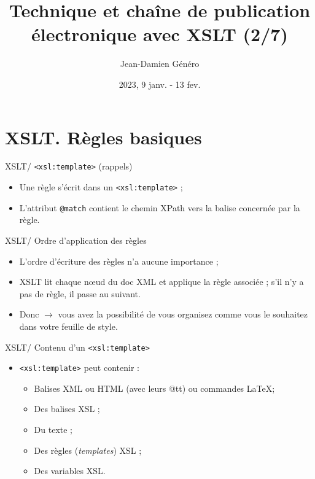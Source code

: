\documentclass{beamer}
\title{Technique et chaîne de publication électronique avec XSLT (2/7)}
\date{2023, 9 janv. - 13 fev.}
\author{Jean-Damien Généro}
\institute{École nationale des chartes -- M2 TNAH}
\begin{document}
  \maketitle

  \section{XSLT. Règles basiques}

    \begin{frame}{XSLT/ \texttt{<xsl:template>} (rappels)}
    \Large
        \begin{itemize}
            \item Une règle s'écrit dans un \texttt{<xsl:template>} ;
            \bigskip
            \item L'attribut \texttt{@match} contient le chemin XPath vers la balise concernée par la règle.
        \end{itemize}
    \end{frame}
    
  \begin{frame}[fragile]{XSLT/ Ordre d'application des règles}
    \Large
        \begin{itemize}
            \item L'ordre d'écriture des règles n'a aucune importance ;
            \item XSLT lit chaque n\oe ud du doc XML et applique la règle associée ; s'il n'y a pas de règle, il passe au suivant.
            \item Donc  $\rightarrow$ vous avez la possibilité de vous organisez comme vous le souhaitez dans votre feuille de style.
        \end{itemize}
    \end{frame}

     \begin{frame}{XSLT/ Contenu d'un \texttt{<xsl:template>}}
         \Large
         \begin{itemize}
             \item \texttt{<xsl:template>} peut contenir :
             \begin{itemize}
             \Large
                 \item Balises XML ou HTML (avec leurs @tt) ou commandes \LaTeX ;
                 \item Des balises XSL ;
                 \item Du texte ;
                 \item Des règles (\textit{templates}) XSL ;
                 \item Des variables XSL.
             \end{itemize}
         \end{itemize}
     \end{frame}
\end{document}
